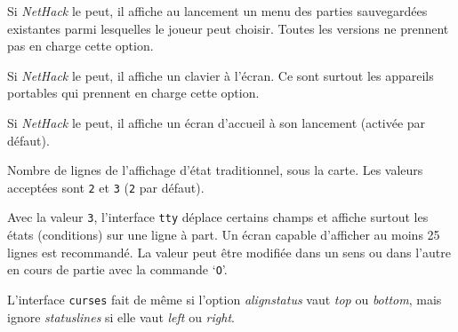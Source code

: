 \documentclass[titlepage]{article}
\begin{document}
\begin{description}[font=\mdseries\itshape]
\item[selectsaved]
Si \textit{NetHack} le peut, il affiche au lancement un menu des parties sauvegardées
existantes parmi lesquelles le joueur peut choisir. Toutes les versions ne prennent pas en charge cette option.
\item[softkeyboard]
Si \textit{NetHack} le peut, il affiche un clavier à l'écran.
Ce sont surtout les appareils portables qui prennent en charge cette option.
\item[splash\textunderscore screen]
Si \textit{NetHack} le peut, il affiche un écran d'accueil à son
lancement (activée par défaut).
\item[statuslines]
Nombre de lignes de l'affichage d'état traditionnel, sous la carte.
Les valeurs acceptées sont \texttt{2} et \texttt{3} (\texttt{2} par défaut).

Avec la valeur \texttt{3}, l'interface \texttt{tty} déplace certains champs et
affiche surtout les états (conditions) sur une ligne à part.
Un écran capable d'afficher au moins 25 lignes est recommandé.
La valeur peut être modifiée dans un sens ou dans l'autre en cours de partie avec la commande `\texttt{O}'.

L'interface \texttt{curses} fait de même si l'option
\textit{align\textunderscore status}
vaut \textit{top} ou \textit{bottom}, mais ignore
\textit{statuslines}
si elle vaut \textit{left} ou \textit{right}.


\end{description}
\end{document}
